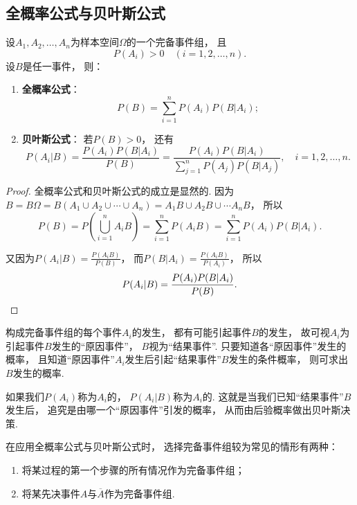 \subsection{全概率公式与贝叶斯公式}
\begin{theorem}
设\(A_1,A_2,\dotsc,A_n\)为样本空间\(\Omega\)的一个完备事件组，
且\[
	P(A_i) > 0 \quad(i=1,2,\dotsc,n).
\]
设\(B\)是任一事件，
则：
\begin{enumerate}
	\item {\rm\bf 全概率公式}：\begin{equation}
		P(B) = \sum_{i=1}^n P(A_i) P(B \vert A_i);
	\end{equation}

	\item {\rm\bf 贝叶斯公式}：
	若\(P(B) > 0\)，
	还有\begin{equation}
		P(A_i \vert B) = \frac{P(A_i) P(B \vert A_i)}{P(B)}
		= \frac{P(A_i) P(B \vert A_i)}{\sum_{j=1}^n P(A_j) P(B \vert A_j)},
		\quad i = 1,2,\dotsc,n.
	\end{equation}
\end{enumerate}
\begin{proof}
全概率公式和贝叶斯公式的成立是显然的.
因为\(B = B \Omega
= B(A_1 \cup A_2 \cup \dotsb \cup A_n)
= A_1 B \cup A_2 B \cup \dotsb A_n B\)，
所以\[
	P(B) = P\left(\bigcup_{i=1}^n A_i B\right)
	= \sum_{i=1}^n P(A_i B)
	= \sum_{i=1}^n P(A_i) P(B \vert A_i).
\]

又因为\(P(A_i \vert B)
= \frac{P(A_i B)}{P(B)}\)，
而\(P(B \vert A_i)
= \frac{P(A_i B)}{P(A_i)}\)，
所以\[
	P(A_i \vert B) = \frac{P(A_i) P(B \vert A_i)}{P(B)}.
	\qedhere
\]
\end{proof}
\end{theorem}

构成完备事件组的每个事件\(A_i\)的发生，
都有可能引起事件\(B\)的发生，
故可视\(A_i\)为引起事件\(B\)发生的“原因事件”，
\(B\)视为“结果事件”.
只要知道各“原因事件”发生的概率，
且知道“原因事件”\(A_i\)发生后引起“结果事件”\(B\)发生的条件概率，
则可求出\(B\)发生的概率.

如果我们\(P(A_i)\)称为\(A_i\)的，
\(P(A_i \vert B)\)称为\(A_i\)的.
这就是当我们已知“结果事件”\(B\)发生后，
追究是由哪一个“原因事件”引发的概率，
从而由后验概率做出贝叶斯决策.

在应用全概率公式与贝叶斯公式时，
选择完备事件组较为常见的情形有两种：
\begin{enumerate}
	\item 将某过程的第一个步骤的所有情况作为完备事件组；

	\item 将某先决事件\(A\)与\(\overline{A}\)作为完备事件组.
\end{enumerate}

